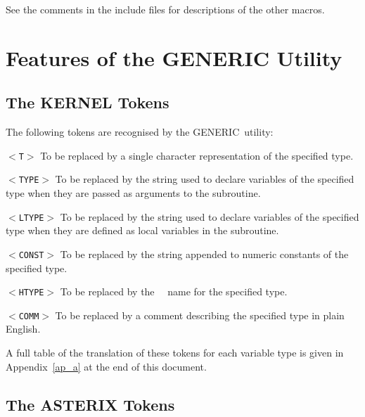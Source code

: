 \documentclass[twoside,11pt,nolof]{starlink}
\providecommand{\GENERIC}{{\footnotesize GENERIC}\normalsize}
\providecommand{\HDS}{{\footnotesize HDS}\normalsize}
\providecommand{\HDSref}{\xref{\HDS}{sun92}{}~}
\providecommand{\latexelsehtml}[2]{#1}
\begin{document}
See the comments in the include files for descriptions of the other macros.

\section{Features of the GENERIC Utility}

\subsection{The KERNEL Tokens}

The following tokens are recognised by the \GENERIC\ utility:

\newlength{\numlen}
\settowidth{\numlen}{000000000000}
\settowidth{\labelsep}{000}

\begin{list}{}{%
\addtolength{\leftmargin}{\labelsep}}

\item[\texttt{$<$T$>$}] To be replaced by a single character representation
of the specified type.

\item[\texttt{$<$TYPE$>$}] To be replaced by the string used to declare variables
of the specified type when they are passed as arguments to
the subroutine.

\item[\texttt{$<$LTYPE$>$}] To be replaced by the string used to declare variables
of the specified type when they are defined as local variables
in the subroutine.

\item[\texttt{$<$CONST$>$}] To be replaced by the string appended to numeric
constants of the specified type.

\item[\texttt{$<$HTYPE$>$}] To be replaced by the \HDSref\ name for the specified
type.

\item[\texttt{$<$COMM$>$}] To be replaced by a comment describing the specified type
in plain English.

\end{list}

A full table of the translation of these tokens for each variable type
is given in
\latexelsehtml{Appendix~\ref{ap_a}}{the
\htmlref{token translations}{ap_a}}
at the end of this document.

\subsection{The ASTERIX Tokens}
\end{document}
